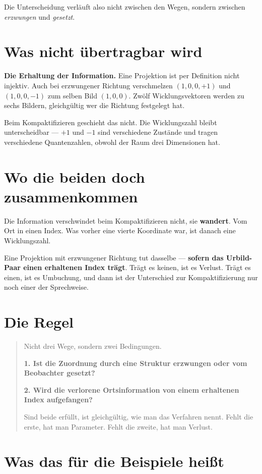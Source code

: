 \documentclass[11pt]{report}
\begin{document}
Die Unterscheidung verläuft also nicht zwischen den Wegen, sondern
zwischen \emph{erzwungen} und \emph{gesetzt}.

\section{Was nicht übertragbar wird}

\textbf{Die Erhaltung der Information.} Eine Projektion ist per
Definition nicht injektiv. Auch bei erzwungener Richtung verschmelzen
$(1,0,0,+1)$ und $(1,0,0,-1)$ zum selben Bild $(1,0,0)$. Zwölf
Wicklungsvektoren werden zu sechs Bildern, gleichgültig wer die
Richtung festgelegt hat.

Beim Kompaktifizieren geschieht das nicht. Die Wicklungszahl bleibt
unterscheidbar --- $+1$ und $-1$ sind verschiedene Zustände und tragen
verschiedene Quantenzahlen, obwohl der Raum drei Dimensionen hat.

\section{Wo die beiden doch zusammenkommen}

Die Information verschwindet beim Kompaktifizieren nicht, sie
\textbf{wandert}. Vom Ort in einen Index. Was vorher eine vierte
Koordinate war, ist danach eine Wicklungszahl.

Eine Projektion mit erzwungener Richtung tut dasselbe --- \textbf{sofern
das Urbild-Paar einen erhaltenen Index trägt}. Trägt es keinen, ist es
Verlust. Trägt es einen, ist es Umbuchung, und dann ist der Unterschied
zur Kompaktifizierung nur noch einer der Sprechweise.

\section{Die Regel}

\begin{quote}
Nicht drei Wege, sondern zwei Bedingungen.

\textbf{1. Ist die Zuordnung durch eine Struktur erzwungen oder vom
Beobachter gesetzt?}

\textbf{2. Wird die verlorene Ortsinformation von einem erhaltenen
Index aufgefangen?}

Sind beide erfüllt, ist gleichgültig, wie man das Verfahren nennt.
Fehlt die erste, hat man Parameter. Fehlt die zweite, hat man Verlust.
\end{quote}

\section{Was das für die Beispiele heißt}
\end{document}
